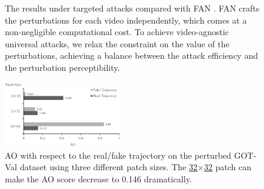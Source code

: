 \documentclass[journal]{IEEEtran}
\begin{document}
\begin{figure}[t]
  \centering
  \vspace{-1mm}
  \caption{The results under targeted attacks compared with FAN \cite{FAN}.  FAN crafts the perturbations for each video independently, which comes at a non-negligible computational cost. To achieve video-agnostic universal attacks, we relax the constraint on the value of the perturbations, achieving a balance between the attack efficiency and the perturbation perceptibility.}
  \label{fig:vis_fan}
  \vspace{-4mm}
\end{figure}
\begin{figure}[t!]
  \begin{center}
    \includegraphics[width=0.45\textwidth]{images_imperceptible/patch_size/patch_size.png}
  \end{center}
  \vspace{-3mm}
  \caption{AO with respect to the real/fake trajectory on the perturbed GOT-Val dataset using three different patch sizes. The \uline{32$\times$32} patch can make the AO score decrease to 0.146 dramatically.}
  \label{fig:patch_size_table}
  \vspace{-3mm}
\end{figure}
\end{document}
